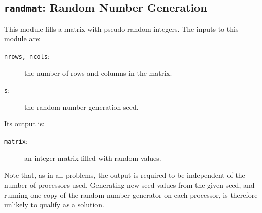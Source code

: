 \subsection{{\tt{randmat}}:
	Random Number Generation
	\label{s:toys-rng}}

This module fills a matrix with pseudo-random integers.
The inputs to this module are:
\begin{description}
\item[{\tt{nrows, ncols}}:]
	the number of rows and columns in the matrix.
\item[{\tt{s}}:]
	the random number generation seed.
\end{description}
Its output is:
\begin{description}
\item[{\tt{matrix}}:]
	an integer matrix filled with random values.
\end{description}
Note that,
as in all problems,
the output is required to be independent of the number of processors used.
Generating new seed values from the given seed,
and running one copy of the random number generator
on each processor,
is therefore unlikely to qualify as a solution.
